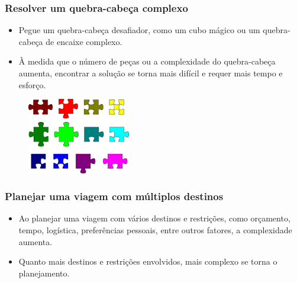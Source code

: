\documentclass[10pt]{beamer}
\begin{document}
\begin{frame}
    \frametitle{Resolver um quebra-cabeça complexo}

    \begin{itemize}
        \item Pegue um quebra-cabeça desafiador, como um cubo mágico ou um quebra-cabeça de encaixe complexo.
        \item À medida que o número de peças ou a complexidade do quebra-cabeça aumenta, encontrar a solução se torna mais difícil e requer mais tempo e esforço.
    \end{itemize}

    \begin{figure}[htb]
        \centering
        \includegraphics[width=0.4\textwidth]{quebracabeca}
        \label{fig:quebracabeca}
    \end{figure}
\end{frame}

\begin{frame}
    \frametitle{Planejar uma viagem com múltiplos destinos}
    \begin{itemize}
        \item Ao planejar uma viagem com vários destinos e restrições, como orçamento, tempo, logística, preferências pessoais, entre outros fatores, a complexidade aumenta.
        \item Quanto mais destinos e restrições envolvidos, mais complexo se torna o planejamento.
    \end{itemize}
\end{frame}
\end{document}
